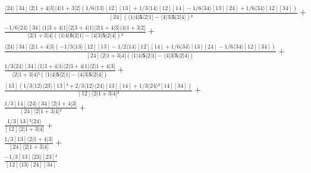 \documentclass[varwidth, border=5pt]{standalone}
\begin{document}
\begin{my}
$\begin{gathered}
\scriptscriptstyle\frac{⟨24⟩[34]⟨2|1+4|3]⟨4|1+3|2](1/6⟨13⟩[12][13]+1/3⟨14⟩[12][14]-1/6⟨34⟩[13][24]+1/6⟨34⟩[12][34])}{[24](⟨1|4|𝟓|2|1]-⟨4|3|𝟓|2|4])²} +\\
\scriptscriptstyle\frac{-1/6⟨24⟩[34]⟨1|3+4|1]⟨2|3+4|1]⟨2|1+4|3]⟨4|1+3|2]}{⟨2|1+3|4](⟨1|4|𝟓|2|1]-⟨4|3|𝟓|2|4])²} +\\
\scriptscriptstyle\frac{⟨24⟩[34]⟨2|1+4|3](-1/3⟨13⟩[12][13]-1/2⟨14⟩[12][14]+1/6⟨34⟩[13][24]-1/6⟨34⟩[12][34])}{[24]⟨2|1+3|4](⟨1|4|𝟓|2|1]-⟨4|3|𝟓|2|4])} +\\
\scriptscriptstyle\frac{1/3⟨24⟩[34]⟨1|3+4|1]⟨2|3+4|1]⟨2|1+4|3]}{⟨2|1+3|4]²(⟨1|4|𝟓|2|1]-⟨4|3|𝟓|2|4])} +\\
\scriptscriptstyle\frac{[13](1/3⟨12⟩⟨23⟩[13]²+2/3⟨12⟩⟨24⟩[13][14]+1/3⟨24⟩²[14][34])}{[12]⟨2|1+3|4]²} +\\
\scriptscriptstyle\frac{1/3[14]⟨24⟩[34]⟨2|1+4|3]}{[24]⟨2|1+3|4]²} +\\
\scriptscriptstyle\frac{1/3[13]²⟨24⟩}{[12]⟨2|1+3|4]} +\\
\scriptscriptstyle\frac{1/3[13]⟨2|1+4|3]}{[24]⟨2|1+3|4]} +\\
\scriptscriptstyle\frac{-1/3[13]⟨23⟩[23]²}{[12]⟨13⟩[24][34]} \phantom{+}
\end{gathered}$
\end{my}
\end{document}
